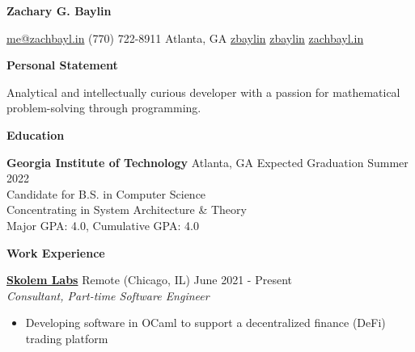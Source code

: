 \documentclass{article}
\newcommand{\sectionHeader}[1]{{\large \textbf{#1}}\hspace{5pt}\xrfill[.6ex]{.4pt}}
\newcommand{\headerInfoSpacer}{\hspace{10pt}}
\newcommand{\sectionSpacer}{\vspace{6pt}}
\begin{document}
  \begin{center}
    \textbf{{\Huge Zachary G. Baylin}}

    \vspace{3pt}

    \href{mailto:me@zachbayl.in}{\faEnvelope \hspace{1pt} me@zachbayl.in} \headerInfoSpacer \faPhone \hspace{1pt} (770) 722-8911 \headerInfoSpacer {} Atlanta, GA \headerInfoSpacer \href{https://linkedin.com/in/zbaylin}{\faLinkedin \hspace{1pt} zbaylin} \headerInfoSpacer \href{https://github.com/zbaylin}{\faGithub \hspace{1pt} zbaylin} \headerInfoSpacer \href{https://zachbayl.in}{\faGlobeAmericas \hspace{1pt} zachbayl.in}\\
  \end{center}

  \sectionHeader{Personal Statement}

  \vspace{3pt}

  Analytical and intellectually curious developer with a passion for mathematical problem-solving through programming.

  \sectionSpacer

  \sectionHeader{Education}

  \vspace{3pt}

  \textbf{Georgia Institute of Technology} \hspace{3pt} {\footnotesize {}} Atlanta, GA \hspace*{\fill} {\footnotesize {}} \hspace{1pt} Expected Graduation Summer 2022\\
  Candidate for B.S. in Computer Science\\
  Concentrating in System Architecture \& Theory\\
  Major GPA: 4.0, Cumulative GPA: 4.0

  \sectionSpacer

  \sectionHeader{Work Experience}

  \href{https://www.skolem.tech/}{\textbf{Skolem Labs}} \hspace{3pt} {\footnotesize {}} Remote (Chicago, IL) \hspace*{\fill} {\footnotesize {}} \hspace{1pt} June 2021 - Present\\
  {\footnotesize {}} \hspace{1pt} \textit{Consultant, Part-time Software Engineer}
  \begin{itemize}
    \item Developing software in OCaml to support a decentralized finance (DeFi) trading platform
  \end{itemize}
\end{document}
